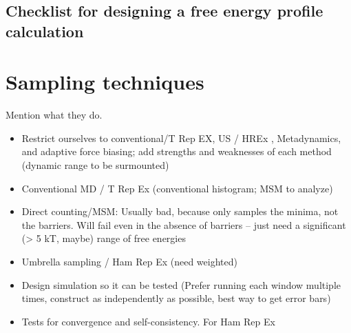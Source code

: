 \documentclass[9pt]{livecoms}
\begin{document}


\subsection{Checklist for designing a free energy profile calculation}

\section{Sampling techniques}

Mention what they do.
\begin{itemize}
\item Restrict ourselves to conventional/T Rep EX, US / HREx , Metadynamics, and adaptive force biasing; add strengths and weaknesses of each method (dynamic range to be surmounted)
\item Conventional MD / T Rep Ex (conventional histogram; MSM to analyze)
\item Direct counting/MSM: Usually bad, because only samples the minima, not the barriers.  Will fail even in the absence of barriers -- just need a significant (> 5 kT, maybe) range of free energies
\item Umbrella sampling / Ham Rep Ex (need weighted)
\item Design simulation so it can be tested (Prefer running each window multiple times, construct as independently as possible, best way to get error bars)
\item Tests for convergence and self-consistency. For Ham Rep Ex\cite{Neale2014}
\end{itemize}
\end{document}
